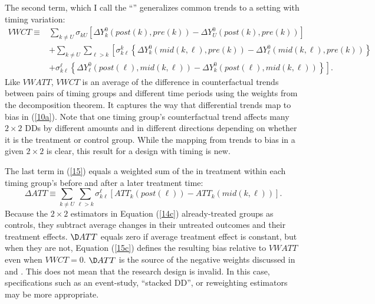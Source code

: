 \documentclass[12pt]{article}
\newcommand{\highlightB}[1]{{\emph{\color{MyBlue}{#1}}}}
\newcommand{\highlightP}[1]{{\emph{\color{MyPink}{#1}}}}
\theoremstyle{definition}
\begin{document}
The second term, which I call the ``\highlightB{variance-weighted common trends (VWCT)}'' generalizes common trends to a setting with timing variation:
\begin{equation}
    \label{15b} \tag{15b}
    \begin{aligned}
        V W C T \equiv & \sum_{k \neq U} \sigma_{k U}\left[\Delta Y_k^0({post}(k), {pre}(k))-\Delta Y_U^0({post}(k), {pre}(k))\right] \\
        & +\sum_{k \neq U} \sum_{\ell>k}\left[\sigma_{k \ell}^k\left\{\Delta Y_k^0({mid}(k, \ell), {pre}(k))-\Delta Y_{\ell}^0({mid}(k, \ell), {pre}(k))\right\}\right. \\
        & \left.+\sigma_{k \ell}^{\ell}\left\{\Delta Y_{\ell}^0({post}(\ell), {mid}(k, \ell))-\Delta Y_k^0({post}(\ell), {mid}(k, \ell))\right\}\right].
    \end{aligned}
\end{equation}
Like $VWATT$, $VWCT$ is an average of the difference in counterfactual trends between pairs of timing groups and different time periods using the weights from the decomposition theorem. It captures the way that differential trends map to bias in (\ref{10a}). Note that one timing group's counterfactual trend affects many $2\times2$ DDs by different amounts and in different directions depending on whether it is the treatment or control group. While the mapping from trends to bias in a given $2\times2$ is clear, this result for a design with timing is new.

The last term in (\ref{15}) equals a weighted sum of the \highlightP{change} in treatment within each timing group's before and after a later treatment time:
\begin{equation}
    \label{15c} \tag{15c}
    \Delta A T T \equiv \sum_{k \neq U} \sum_{\ell>k} \sigma_{k \ell}^{\ell}\left[{ATT}_k({post}(\ell))-A T T_k({mid}(k, \ell))\right].
\end{equation}
Because the $2\times2$ estimators in Equation (\ref{14c}) already-treated groups as controls, they subtract average changes in their untreated outcomes and their treatment effects. $\D ATT$ equals zero if average treatment effect is constant, but when they are not, Equation (\ref{15c}) defines the resulting bias relative to $VWATT$ even when $VWCT=0$. $\D ATT$ is the source of the negative weights discussed in \citet{borusyakRevisitingEventStudyDesigns2024} and \citet{dechaisemartinTwoWayFixedEffects2020}. This does not mean that the research design is invalid. In this case, specifications such as an event-study, ``stacked DD'', or reweighting estimators may be more appropriate.
\end{document}
